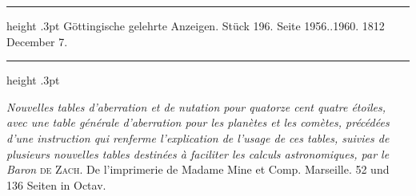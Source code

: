 \par\bigskip
{}
\hypertarget{native-551-lower}{}\label{native-551-lower}
\begin{center}
\parbox{.88\linewidth}{%
\centering\small
\hrule height .3pt\relax\vspace{2.5pt}
Göttingische gelehrte Anzeigen. Stück 196. Seite 1956..1960. 1812 December 7.\par
\vspace{2.5pt}\hrule height .3pt\relax
}
\end{center}
\par\nobreak\medskip

\emph{Nouvelles tables d'aberration et de nutation pour quatorze cent quatre étoiles, avec une table générale d'aberration pour les planètes et les comètes, précédées d'une instruction qui renferme l'explication de l'usage de ces tables, suivies de plusieurs nouvelles tables destinées à faciliter les calculs astronomiques, par le Baron} \textsc{de Zach}. De l'imprimerie de Madame Mine et Comp. Marseille. 52 und 136 Seiten in Octav.

